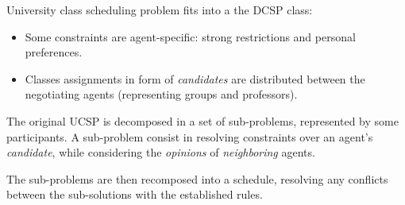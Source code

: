 \documentclass[header]{subfiles}
\begin{document}
University class scheduling problem fits into a the DCSP class:
\begin{itemize}
  \item Some constraints are agent-specific: strong restrictions and
        personal preferences.
  \item Classes assignments in form of \emph{candidates} are distributed between
        the negotiating agents (representing groups and professors).
\end{itemize}

The original UCSP is decomposed in a set of sub-problems, represented by some
participants. A sub-problem consist in resolving constraints over an agent's
\emph{candidate}, while considering the \emph{opinions} of \emph{neighboring}
agents.

The sub-problems are then recomposed into a schedule, resolving any conflicts
between the sub-solutions with the established rules.
\end{document}
